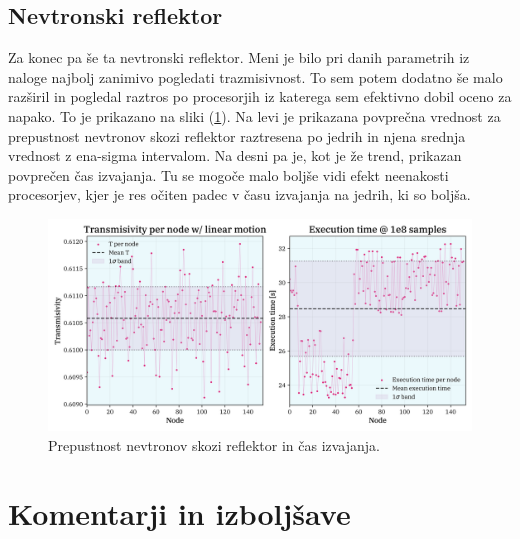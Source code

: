 \documentclass[a4paper]{article}
\begin{document}
\subsection{Nevtronski reflektor}
Za konec pa še ta nevtronski reflektor. Meni je bilo pri danih parametrih iz naloge najbolj zanimivo pogledati
trazmisivnost. To sem potem dodatno še malo razširil in pogledal raztros po procesorjih iz katerega sem efektivno dobil 
oceno za napako. To je prikazano na sliki (\ref{fig:linear_motion}). Na levi je prikazana povprečna vrednost za prepustnost
nevtronov skozi reflektor raztresena po jedrih in njena srednja vrednost z ena-sigma intervalom. Na desni pa je, kot je 
že trend, prikazan povprečen čas izvajanja. Tu se mogoče malo boljše vidi efekt neenakosti procesorjev, kjer je 
res očiten padec v času izvajanja na jedrih, ki so boljša. \\

\begin{figure}[H]
    \centering
    \includegraphics[width=\textwidth]{../NeutronReflector/Images/linear_motion.png}
    \caption{Prepustnost nevtronov skozi reflektor in čas izvajanja.}
    \label{fig:linear_motion}
\end{figure}

\section{Komentarji in izboljšave}

\newpage


\end{document}
